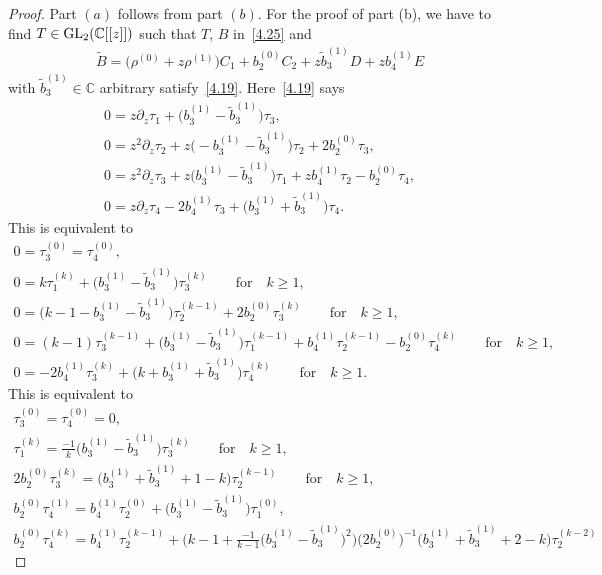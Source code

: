 \documentclass[pdftex]{sigma}%
\numberwithin{equation}{section}
\numberwithin{figure}{section}
\newcommand{\C}{{\mathbb C}}
\newcommand{\www}{\widetilde}
\newcommand{\paa}{\partial}
\begin{document}
\begin{proof}
Part $(a)$ follows from part $(b)$.
For the proof of part (b), we have to find
$T\in {\rm GL}_2(\C[[z]])$ such that $T$, $B$ in~\eqref{4.25}
and
\begin{gather*}
\www B=\big(\rho^{(0)}+z\rho^{(1)}\big)C_1+b_2^{(0)}C_2+z\www b_3^{(1)}D+zb_4^{(1)}E
\end{gather*}
with $\www b_3^{(1)}\in\C$ arbitrary satisfy~\eqref{4.19}.
Here~\eqref{4.19} says
\begin{gather*}%
0= z\paa_z\tau_1 + \big(b_3^{(1)}-\www b_3^{(1)}\big)\tau_3,
\\
0= z^2\paa_z\tau_2 + z\big({-}b_3^{(1)}-\www b_3^{(1)}\big)\tau_2+2b_2^{(0)}\tau_3,
\\
0= z^2\paa_z\tau_3 + z\big(b_3^{(1)}-\www b_3^{(1)}\big)\tau_1+ zb_4^{(1)}\tau_2-b_2^{(0)}\tau_4,
\\
0= z\paa_z\tau_4 -2b_4^{(1)}\tau_3+ \big(b_3^{(1)}+\www b_3^{(1)}\big)\tau_4.
\end{gather*}
This is equivalent to
\begin{gather*}%
0=\tau_3^{(0)}=\tau_4^{(0)},
\\
0= k\tau_1^{(k)} + \big(b_3^{(1)}-\www b_3^{(1)}\big)\tau_3^{(k)}\qquad
\text{for}\quad k\geq 1,
\\
0= \big(k-1-b_3^{(1)}-\www b_3^{(1)}\big)\tau_2^{(k-1)}+2b_2^{(0)}\tau_3^{(k)}\qquad
\text{for}\quad k\geq 1,
\\
0= (k-1)\tau_3^{(k-1)}+ \big(b_3^{(1)}-\www b_3^{(1)}\big)\tau_1^{(k-1)}
+ b_4^{(1)}\tau_2^{(k-1)}-b_2^{(0)}\tau_4^{(k)}\qquad
\text{for}\quad k\geq 1,
\\
0= -2b_4^{(1)}\tau_3^{(k)}+ \big(k+b_3^{(1)}+\www b_3^{(1)}\big)\tau_4^{(k)}\qquad
\text{for}\quad k\geq 1.
\end{gather*}
This is equivalent to
\begin{gather}
\tau_3^{(0)}=\tau_4^{(0)}=0,\nonumber
\\
\tau_1^{(k)}= \frac{-1}{k}\big(b_3^{(1)}-\www b_3^{(1)}\big)\tau_3^{(k)}\qquad
\text{for}\quad k\geq 1,\nonumber
\\
2b_2^{(0)}\tau_3^{(k)}= \big(b_3^{(1)}+\www b_3^{(1)}+1-k\big)\tau_2^{(k-1)}\qquad
\text{for}\quad k\geq 1,\nonumber
\\
b_2^{(0)}\tau_4^{(1)}=b_4^{(1)}\tau_2^{(0)}+\big(b_3^{(1)}-\www b_3^{(1)}\big)\tau_1^{(0)},\nonumber
\\
b_2^{(0)}\tau_4^{(k)}=b_4^{(1)}\tau_2^{(k-1)}
+\bigg(k-1+\frac{-1}{k-1}\big(b_3^{(1)}-\www b_3^{(1)}\big)^2\bigg)
\big(2b_2^{(0)}\big)^{-1}\big(b_3^{(1)}+\www b_3^{(1)}+2-k\big)\tau_2^{(k-2)}\nonumber

\end{gather}
\end{proof}
\end{document}
